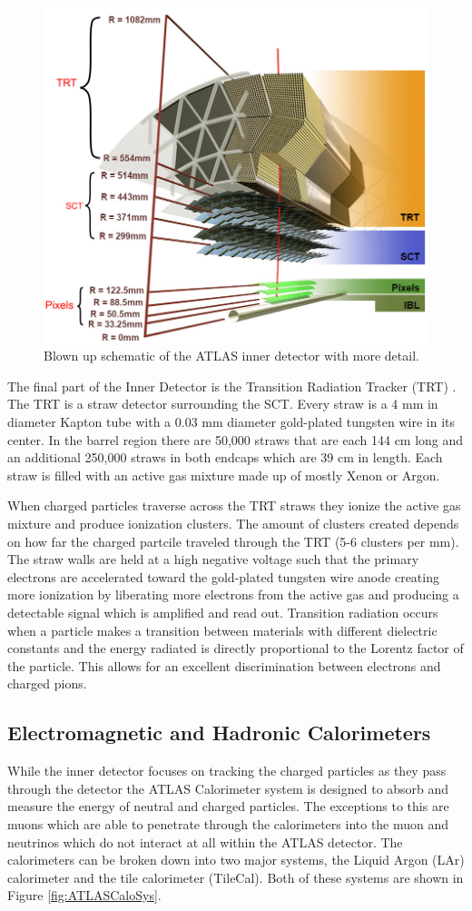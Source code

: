 \begin{figure}[h!]
	\centering
	\includegraphics[width=0.5\columnwidth]{../ThesisImages/LHCImages/ATLASInnerStructure.png}
	\caption[Blown up schematic of the ATLAS inner detector with more detail.]{Blown up schematic of the ATLAS inner detector with more detail.\cite{Potamianos:2016ptf}
	}
	\label{fig:ATLASInnerDet}
\end{figure}

The final part of the Inner Detector is the Transition Radiation Tracker (TRT) \cite{Mindur:2017nqn}.  The TRT is a straw detector surrounding the SCT.  Every straw is a 4 mm in diameter Kapton tube with a 0.03 mm diameter gold-plated tungsten wire in its center.  In the barrel region there are 50,000 straws that are each 144 cm long and an additional 250,000 straws in both endcaps which are 39 cm in length.  Each straw is filled with an active gas mixture made up of mostly Xenon or Argon. 

When charged particles traverse across the TRT straws they ionize the active gas mixture and produce ionization clusters.  The amount of clusters created depends on how far the charged partcile traveled through the TRT (5-6 clusters per mm).  The straw walls are held at a high negative voltage such that the primary electrons are accelerated toward the gold-plated tungsten wire anode creating more ionization by liberating more electrons from the active gas and producing a detectable signal which is amplified and read out.  Transition radiation occurs when a particle makes a transition between materials with different dielectric constants and the energy radiated is directly proportional to the Lorentz factor of the particle.  This allows for an excellent discrimination between electrons and charged pions.



\subsection{Electromagnetic and Hadronic Calorimeters}
\label{sec:EMHCal}
While the inner detector focuses on tracking the charged particles as they pass through the detector the ATLAS Calorimeter system is designed to absorb and measure the energy of neutral and charged particles.  The exceptions to this are muons which are able to penetrate through the calorimeters into the muon and neutrinos which do not interact at all within the ATLAS detector.  The calorimeters can be broken down into two major systems, the Liquid Argon (LAr) calorimeter\cite{CERN-LHCC-96-041} and the tile calorimeter (TileCal)\cite{CERN-LHCC-96-042}.  Both of these systems are shown in Figure \ref{fig:ATLASCaloSys}.

